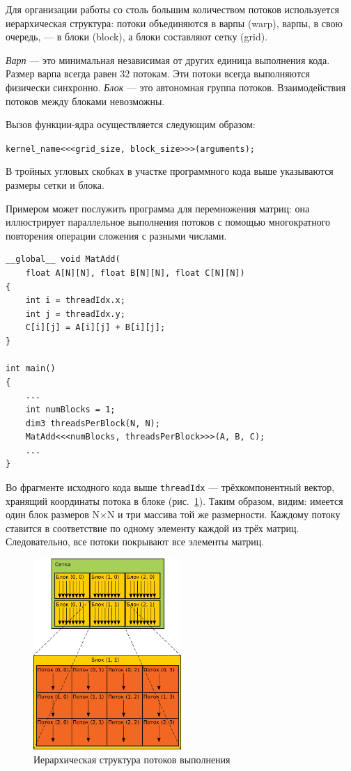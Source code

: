 Для организации работы со столь большим количеством потоков используется иерархическая структура: потоки объединяются в варпы (warp), варпы, в
свою очередь, --- в блоки (block), а блоки составляют сетку (grid).

\textit{Варп} --- это минимальная независимая от других единица выполнения кода. Размер варпа всегда равен 32 потокам. Эти потоки всегда выполняются физически синхронно. \textit{Блок} --- это автономная группа потоков. Взаимодействия
потоков между блоками невозможны.


Вызов функции-ядра осуществляется следующим образом:

\texttt{kernel\_name<{<}<grid\_size, block\_size>{>}>(arguments);}

В тройных угловых скобках в участке программного кода выше указываются размеры сетки и блока.

Примером может послужить программа для перемножения матриц: она
иллюстрирует параллельное выполнения потоков с помощью многократного
повторения операции сложения с разными числами.

\begin{lstlisting}
__global__ void MatAdd(
	float A[N][N], float B[N][N], float C[N][N])
{
	int i = threadIdx.x;
	int j = threadIdx.y;
	C[i][j] = A[i][j] + B[i][j];
}

int main()
{
	...
	int numBlocks = 1;
	dim3 threadsPerBlock(N, N);
	MatAdd<<<numBlocks, threadsPerBlock>>>(A, B, C);
	...
}
\end{lstlisting}

Во фрагменте исходного кода выше \texttt{threadIdx} --- трёхкомпонентный вектор, хранящий координаты потока в блоке (рис.~\ref{fig:ThreadsStructure}). Таким образом, видим: имеется один блок размеров N$ \times $N и три массива той же размерности. Каждому потоку ставится в соответствие по одному элементу каждой из трёх матриц. Следовательно, все потоки покрывают все элементы матриц. 

\afterpage{\clearpage}\begin{figure}[p]
\centering
\includegraphics[width=0.5\textwidth]{include/graphics/image2}
\caption{Иерархическая структура потоков выполнения}
\label{fig:ThreadsStructure}
\end{figure}

